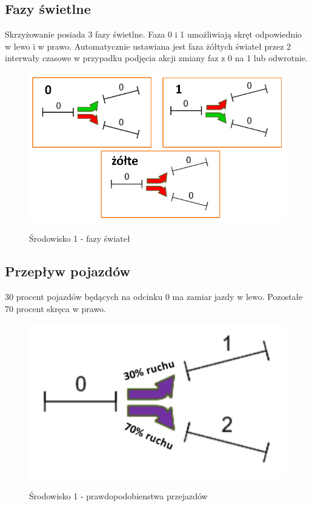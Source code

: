 \documentclass[12pt]{book}
\theoremstyle{plain}
\begin{document}
	\subsection{Fazy świetlne}
	Skrzyżowanie posiada 3 fazy świetlne. Faza 0 i 1 umożliwiają skręt odpowiednio w lewo i w prawo. Automatycznie ustawiana jest faza żółtych świateł przez 2 interwały czasowe w przypadku podjęcia akcji zmiany faz z 0 na 1 lub odwrotnie. 
	
	\begin{figure}[H]
		\centering
		\includegraphics[width=14cm]{images/env_1_fazy}
		\label{fig:env_1_fazy}
		\caption{Środowisko 1 - fazy świateł}
	\end{figure}
	
	\subsection{Przepływ pojazdów}
	30 procent pojazdów będących na odcinku 0 ma zamiar jazdy w lewo. Pozostałe 70 procent skręca w prawo. 
	\begin{figure}[H]
		\centering
		\includegraphics[width=14cm]{images/env_1_ruch}
		\label{fig:env_1_ruch}
		\caption{Środowisko 1 - prawdopodobienstwa przejazdów}
	\end{figure}
	
\end{document}

